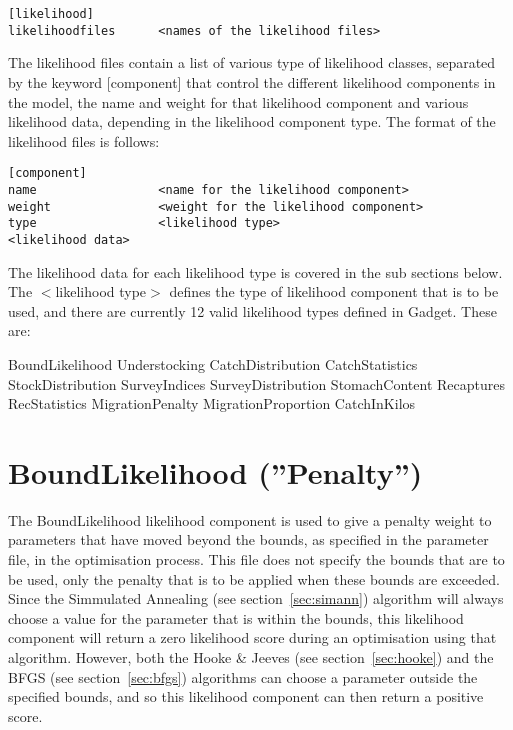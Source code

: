 \documentclass[10pt,twoside]{book}
\begin{document}
{\small\begin{verbatim}
[likelihood]
likelihoodfiles      <names of the likelihood files>
\end{verbatim}}

The likelihood files contain a list of various type of likelihood classes, separated by the keyword [component] that control the different likelihood components in the model, the name and weight for that likelihood component and various likelihood data, depending in the likelihood component type.  The format of the likelihood files is follows:

{\small\begin{verbatim}
[component]
name                 <name for the likelihood component>
weight               <weight for the likelihood component>
type                 <likelihood type>
<likelihood data>
\end{verbatim}}

The likelihood data for each likelihood type is covered in the sub sections below.  The $<$likelihood type$>$ defines the type of likelihood component that is to be used, and there are currently 12 valid likelihood types defined in Gadget.  These are:

\bigskip
BoundLikelihood\newline
Understocking\newline
CatchDistribution\newline
CatchStatistics\newline
StockDistribution\newline
SurveyIndices\newline
SurveyDistribution\newline
StomachContent\newline
Recaptures\newline
RecStatistics\newline
MigrationPenalty\newline
MigrationProportion\newline
CatchInKilos

\section{BoundLikelihood (''Penalty'')}\label{sec:boundlike}
The BoundLikelihood likelihood component is used to give a penalty weight to parameters that have moved beyond the bounds, as specified in the parameter file, in the optimisation process.  This file does not specify the bounds that are to be used, only the penalty that is to be applied when these bounds are exceeded.  Since the Simmulated Annealing (see section~\ref{sec:simann}) algorithm will always choose a value for the parameter that is within the bounds, this likelihood component will return a zero likelihood score during an optimisation using that algorithm.  However, both the Hooke \& Jeeves (see section~\ref{sec:hooke}) and the BFGS (see section~\ref{sec:bfgs}) algorithms can choose a parameter outside the specified bounds, and so this likelihood component can then return a positive score.
\end{document}
